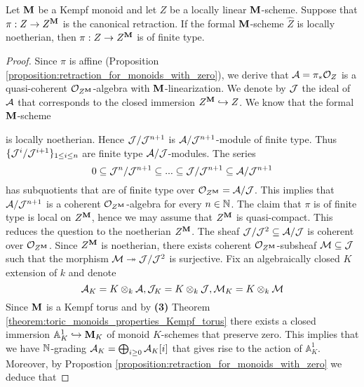 \begin{theorem}
Let $\mathbf{M}$ be a Kempf monoid and let $Z$ be a locally linear $\mathbf{M}$-scheme. Suppose that $\pi:Z\rightarrow Z^{\mathbf{M}}$ is the canonical retraction. If the formal $\mathbf{M}$-scheme $\widehat{Z}$ is locally noetherian, then $\pi:Z\rightarrow Z^{\mathbf{M}}$ is of finite type.
\end{theorem}
\begin{proof}
Since $\pi$ is affine (Proposition \ref{proposition:retraction_for_monoids_with_zero}), we derive that ${\mathcal A} = \pi_*{\mathcal O}_Z$ is a quasi-coherent ${\mathcal O}_{Z^{\mathbf{M}}}$-algebra with $\mathbf{M}$-linearization. We denote by ${\mathcal J}$ the ideal of ${\mathcal A}$ that corresponds to the closed immersion $Z^{\mathbf{M}}\hookrightarrow Z$. We know that the formal $\mathbf{M}$-scheme
\begin{center}
\end{center}
is locally noetherian. Hence ${\mathcal J}/{\mathcal J}^{n+1}$ is ${\mathcal A}/{\mathcal J}^{n+1}$-module of finite type. Thus $\{{\mathcal J}^i/{\mathcal J}^{i+1}\}_{1\leq i\leq n}$ are finite type ${\mathcal A}/{\mathcal J}$-modules. The series
$$0 \subseteq {\mathcal J}^n/{\mathcal J}^{n+1} \subseteq  ... \subseteq {\mathcal J}/{\mathcal J}^{n+1} \subseteq {\mathcal A}/{\mathcal J}^{n+1}$$
has subquotients that are of finite type over ${\mathcal O}_{Z^{\mathbf{M}}} = {\mathcal A}/{\mathcal J}$. This implies that ${\mathcal A}/{\mathcal J}^{n+1}$ is a coherent ${\mathcal O}_{Z^{\mathbf{M}}}$-algebra for every $n\in {\mathbb N}$. The claim that $\pi$ is of finite type is local on $Z^{\mathbf{M}}$, hence we may assume that $Z^{\mathbf{M}}$ is quasi-compact. This reduces the question to the noetherian $Z^{\mathbf{M}}$. The sheaf ${\mathcal J}/{\mathcal J}^2\subseteq {\mathcal A}/{\mathcal J}$ is coherent over ${\mathcal O}_{Z^{\mathbf{M}}}$. Since $Z^{\mathbf{M}}$ is noetherian, there exists coherent ${\mathcal O}_{Z^{\mathbf{M}}}$-subsheaf ${\mathcal M}\subseteq {\mathcal J}$ such that the morphism ${\mathcal M}\twoheadrightarrow {\mathcal J}/{\mathcal J}^2$ is surjective. Fix an algebraically closed $K$ extension of $k$ and denote
$${\mathcal A}_K = K\otimes_k{\mathcal A},{\mathcal J}_K = K\otimes_k{\mathcal J},{\mathcal M}_K = K\otimes_k{\mathcal M}$$
Since $\mathbf{M}$ is a Kempf torus and by \textbf{(3)} Theorem \ref{theorem:toric_monoids_properties_Kempf_torus} there exists a closed immersion $\mathbb{A}^1_K\hookrightarrow \mathbf{M}_K$ of monoid $K$-schemes that preserve zero. This implies that we have ${\mathbb N}$-grading ${\mathcal A}_K = \bigoplus_{i\geq 0}{\mathcal A}_K[i]$ that gives rise to the action of $\mathbb{A}^1_K$. Moreover, by Propostion \ref{proposition:retraction_for_monoids_with_zero} we deduce that

\end{proof}
